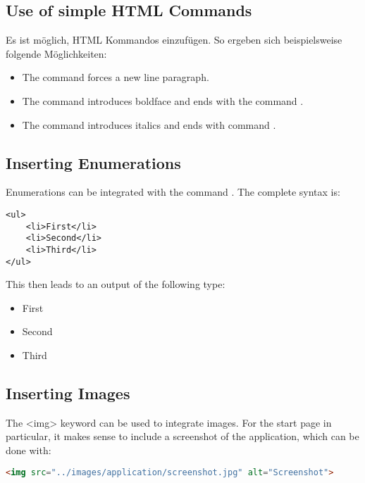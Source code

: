 \subsection{Use of simple HTML Commands}

Es ist möglich, HTML Kommandos einzufügen. So ergeben sich beispielsweise folgende Möglichkeiten:

\begin{itemize}
  \item The command  forces a new line paragraph.
  \item The command   introduces boldface and ends with the command .
  \item The command  introduces italics and ends with command .
\end{itemize}


\subsection{Inserting Enumerations}

Enumerations can be integrated with the command . The complete syntax is:

\begin{lstlisting}
<ul>
    <li>First</li>
    <li>Second</li>
    <li>Third</li>
</ul>
\end{lstlisting}

\bigskip

This then leads to an output of the following type:

\begin{itemize}
	\item First
	\item Second
	\item Third
\end{itemize}

\subsection{Inserting Images}

The <img> keyword  can be used to integrate images. For the start page in particular, it makes sense to include a screenshot of the application, which can be done with:

\begin{lstlisting}[language=html]
	<img src="../images/application/screenshot.jpg" alt="Screenshot">
\end{lstlisting}


